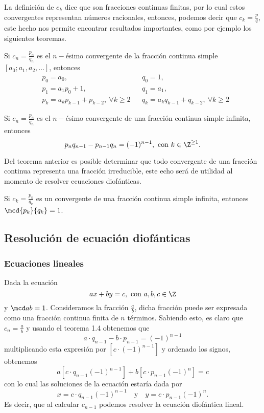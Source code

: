 La definición de $c_k$ dice que son fracciones continuas finitas, por lo cual estos convergentes representan números racionales,
entonces, podemos decir que $c_k = \frac{p}{q}$, este hecho nos permite encontrar resultados importantes, como por ejemplo los siguientes teoremas.

\begin{theorem.box}{}{}
    Si $c_n = \frac{p_n}{q_n}$ es el $n-$ésimo convergente de la fracción continua simple $[a_0; a_1, a_2, \ldots]$, entonces
    \begin{align*}
        &p_0 = a_0, && q_0 = 1,\\
        &p_1 = a_1 p_0 + 1, && q_1 = a_1,\\
        &p_k = a_k p_{k - 1} + p_{k - 2},\ \forall k \geq 2 && q_k = a_k q_{k - 1} + q_{k - 2},\ \forall k \geq 2
    \end{align*}
\end{theorem.box}

\begin{theorem.box}{}{}
    Si $c_n = \frac{p_n}{q_n}$ es el $n-$ésimo convergente de una fracción continua simple infinita, entonces
    \[
        p_n q_{n - 1} - p_{n - 1}q_n = (- 1)^{n-1}, \ \text{con}\ k \in \Z^{\geq 1}.
    \]
\end{theorem.box}
Del teorema anterior es posible determinar que todo convergente de una fracción continua representa una fracción irreducible, este echo será de utilidad al momento de resolver ecuaciones diofánticas.
\begin{corollary}
    Si $c_k = \frac{p_k}{q_k}$ es un convergente de una fracción continua simple infinita, entonces $\mcd{p_k}{q_k} = 1$.
\end{corollary}



\subsection{Resolución de ecuación diofánticas}

\subsubsection{Ecuaciones lineales}

Dada la ecuación
\[
    ax + by = c,\ \text{con}\ a,b,c \in \Z
\]
y $\mcd a b = 1$.
Consideramos la fracción $\frac{a}{b}$, dicha fracción puede ser expresada como una fracción continua finita de $n$ términos.
Sabiendo esto, es claro que $c_n = \frac{a}{b}$ y usando el teorema 1.4 obtenemos que
\[
    a\cdot q_{n - 1} - b\cdot p_{n - 1} = (-1)^{n- 1}
\]
multiplicando esta expresión por $\left[c \cdot (-1)^{n - 1}\right]$ y ordenado los signos, obtenemos
\[
    a \left[c\cdot q_{n - 1} (-1)^{n - 1}\right] + b \left[c \cdot p_{n - 1} (-1)^n\right] = c
\]
con lo cual las soluciones de la ecuación estaría dada por
\[
    x = c \cdot q_{n - 1} (-1)^{n - 1} \quad \text{y} \quad y = c \cdot p_{n - 1} (-1)^{n}.
\]
Es decir, que al calcular $c_{n - 1}$ podemos resolver la ecuación diofántica lineal.

